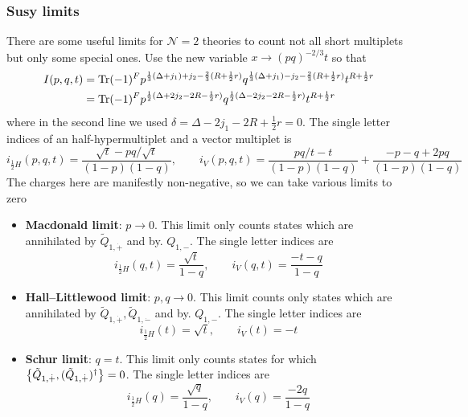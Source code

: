 \documentclass[11pt]{article}
\theoremstyle{definition}
\numberwithin{equation}{section}
\newcommand*\cN{\mathcal{N}}
\begin{document}
\subsubsection{Susy limits}
There are some useful limits for $\cN=2$ theories to count not all short multiplets but only some special ones. Use the new variable $x\rightarrow (pq)^{-2/3}t$ so that
\begin{equation}
\begin{split}
	I(p,q,t)&=\operatorname{Tr} (-1)^{F}p^{\frac{1}{3}(\Delta+j_{1})+j_{2}-\frac{2}{3} (R+\frac{1}{2} r)}q^{\frac{1}{3}(\Delta+j_{1})-j_{2}-\frac{2}{3}(R+\frac{1}{2}r)}t^{R+\frac{1}{2}r}\\
	&=\operatorname{Tr} (-1)^{F}p^{\frac{1}{2}(\Delta+2j_{2}-2R-\frac{1}{2}r)}q^{\frac{1}{2}(\Delta-2j_{2}-2R-\frac{1}{2}r)}t^{R+\frac{1}{2}r}
\end{split}
\end{equation}
where in the second line we used $\delta=\Delta-2j_{1}-2R+\frac{1}{2}r=0$. The single letter indices of an half-hypermultiplet and a vector multiplet is
\begin{equation}
	i_{\frac{1}{2}H}(p,q,t)=\frac{\sqrt{t}-pq/\sqrt{t}}{(1-p)(1-q)},\qquad i_{V}(p,q,t)=\frac{pq/t-t}{(1-p)(1-q)}+\frac{-p-q+2pq}{(1-p)(1-q)}
\end{equation}
The charges here are manifestly non-negative, so we can take various limits to zero
\begin{itemize}
	\item \textbf{Macdonald limit}: $p\rightarrow 0$. This limit only counts states which are annihilated by $\tilde Q_{1,\dot{+}}$ and by. $Q_{1,-}$. The single letter indices are
	\begin{equation}
		i_{\frac{1}{2}H}(q,t)=\frac{\sqrt{t}}{1-q},\qquad i_{V}(q,t)=\frac{-t-q}{1-q}
	\end{equation}
	\item \textbf{Hall--Littlewood limit}: $p,q\rightarrow0$. This limit counts only states which are annihilated by $\tilde Q_{1,\dot{+}},\tilde{Q}_{1,\dot{-}}$ and by. $Q_{1,-}$. The single letter indices are
	\begin{equation}
		i_{\frac{1}{2}H}(t)=\sqrt{t},\qquad i_{V}(t)=-t
	\end{equation}
	\item \textbf{Schur limit}: $q=t$. This limit only counts states for which $\acomm{\tilde{Q}_{1,\dot{+}}}{(\tilde{Q}_{1,\dot{+}})^{\dagger}}=0$. The single letter indices are
	\begin{equation}
		i_{\frac{1}{2}H}(q)=\frac{\sqrt{q}}{1-q},\qquad i_{V}(q)=\frac{-2q}{1-q}
	\end{equation}
\end{itemize}
\end{document}
